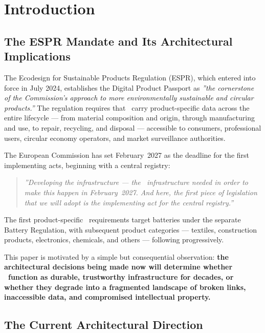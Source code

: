 \section{Introduction}

\subsection{The ESPR Mandate and Its Architectural Implications}

The Ecodesign for Sustainable Products Regulation (ESPR), which entered into
force in July 2024, establishes the Digital Product Passport as \emph{''the
cornerstone of the Commission's approach to more environmentally sustainable and
circular products.''} The regulation requires that \DPPs\ carry product-specific
data across the entire lifecycle --- from material composition and origin,
through manufacturing and use, to repair, recycling, and disposal --- accessible
to consumers, professional users, circular economy operators, and market
surveillance authorities.

The European Commission has set February~2027 as the deadline for the first
implementing acts, beginning with a central registry:

\begin{quote}\emph{
''Developing the infrastructure --- the \IT\ infrastructure needed in order to
make this happen in February~2027. And here, the first piece of legislation that
we will adopt is the implementing act for the central registry.''
}
\end{quote}

The first product-specific \DPP\ requirements target batteries under the
separate Battery Regulation, with subsequent product categories --- textiles,
construction products, electronics, chemicals, and others --- following
progressively.

This paper is motivated by a simple but consequential observation: \textbf{the
architectural decisions being made now will determine whether \DPPs\ function as
durable, trustworthy infrastructure for decades, or whether they degrade into a
fragmented landscape of broken links, inaccessible data, and compromised
intellectual property.}

\subsection{The Current Architectural Direction}

